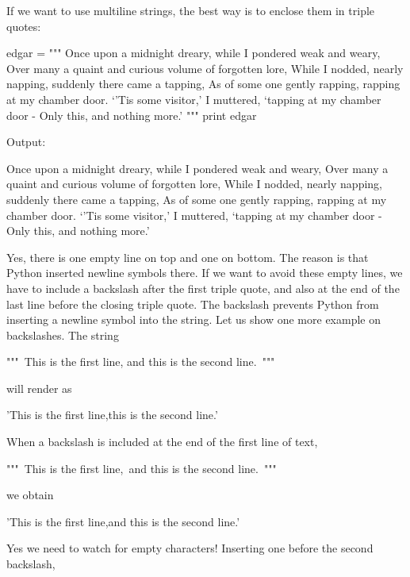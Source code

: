 If we want to use multiline strings, the best way is to enclose them 
in triple quotes: 

\begin{bluecode}
edgar = """
Once upon a midnight dreary, while I pondered weak and weary,
Over many a quaint and curious volume of forgotten lore,
While I nodded, nearly napping, suddenly there came a tapping,
As of some one gently rapping, rapping at my chamber door.
`'Tis some visitor,' I muttered, `tapping at my chamber door -
Only this, and nothing more.'
"""
print edgar
\end{bluecode}
Output:

\begin{bluecode}

Once upon a midnight dreary, while I pondered weak and weary,
Over many a quaint and curious volume of forgotten lore,
While I nodded, nearly napping, suddenly there came a tapping,
As of some one gently rapping, rapping at my chamber door.
`'Tis some visitor,' I muttered, `tapping at my chamber door -
Only this, and nothing more.'

\end{bluecode}
Yes, there is one empty line on top and one on bottom. The reason is that 
Python inserted newline symbols there. If we want to avoid these empty lines, 
we have to include a backslash after the first triple quote, and also at the 
end of the last line before the closing triple quote. The backslash prevents 
Python from inserting a newline symbol into the string. Let us show one more 
example on backslashes. The string 

\begin{bluecode}
"""\
This is the first line,
and this is the second line.\
""" 
\end{bluecode}
will render as

\begin{bluecode}
'This is the first line,\nand this is the second line.' 
\end{bluecode}
When a backslash is included at the end of the first line of text,

\begin{bluecode}
"""\
This is the first line,\
and this is the second line.\
""" 
\end{bluecode}
we obtain 

\begin{bluecode}
'This is the first line,and this is the second line.'
\end{bluecode}
Yes we need to watch for empty characters! Inserting one before the second 
backslash,

